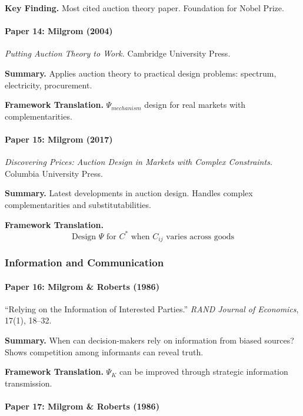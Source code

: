 \textbf{Key Finding.}
Most cited auction theory paper. Foundation for Nobel Prize.

\paragraph{Paper 14: Milgrom (2004)}

\textit{Putting Auction Theory to Work.}
Cambridge University Press.

\textbf{Summary.}
Applies auction theory to practical design problems: spectrum, electricity, 
procurement.

\textbf{Framework Translation.}
$\Psi_{mechanism}$ design for real markets with complementarities.

\paragraph{Paper 15: Milgrom (2017)}

\textit{Discovering Prices: Auction Design in Markets with Complex Constraints.}
Columbia University Press.

\textbf{Summary.}
Latest developments in auction design. Handles complex complementarities 
and substitutabilities.

\textbf{Framework Translation.}
\begin{equation}
\text{Design } \Psi \text{ for } C^* \text{ when } C_{ij} \text{ varies across goods}
\end{equation}

\subsubsection{Information and Communication}

\paragraph{Paper 16: Milgrom \& Roberts (1986)}

``Relying on the Information of Interested Parties.''
\textit{RAND Journal of Economics}, 17(1), 18--32.

\textbf{Summary.}
When can decision-makers rely on information from biased sources? 
Shows competition among informants can reveal truth.

\textbf{Framework Translation.}
$\Psi_K$ can be improved through strategic information transmission.

\paragraph{Paper 17: Milgrom \& Roberts (1986)}

